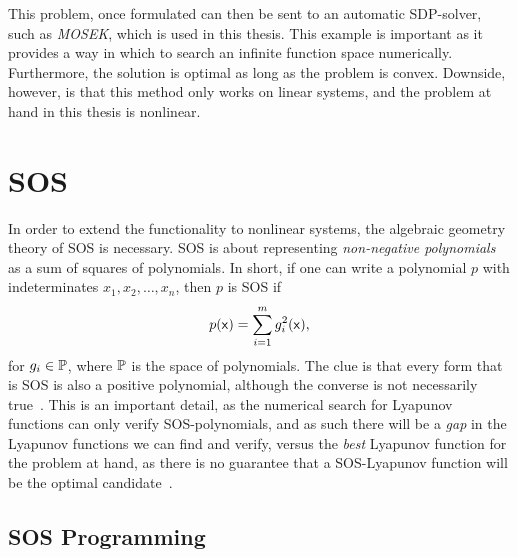 This problem, once formulated can then be sent to an automatic \ac{SDP}-solver,
such as \textit{MOSEK}\cite{mosek}, which is used in this thesis. This example
is important as it provides a way in which to search an infinite function space
numerically. Furthermore, the solution is optimal as long as the problem is
convex. Downside, however, is that this method only works on linear systems, and
the problem at hand in this thesis is nonlinear.

\section{SOS}

In order to extend the functionality to nonlinear systems, the algebraic
geometry theory of \ac{SOS} is necessary. \ac{SOS} is about representing
\textit{non-negative polynomials} as a sum of squares of polynomials. In short,
if one can write a polynomial \(p\) with indeterminates \(x_1,x_2,\ldots,x_n\),
then \(p\) is \ac{SOS} if
\[
  p(\vect{x}) = \sum_{i=1}^{m}g_i^2(\vect{x}),
\]
for \(g_i \in \P\), where \(\P\) is the space of polynomials. The clue is that
every form that is \ac{SOS} is also a positive polynomial, although the converse
is not necessarily true~\cite{majumdarFunnelLibrariesRealtime2017}. This is an
important detail, as the numerical search for Lyapunov functions can only verify
\ac{SOS}-polynomials, and as such there will be a \textit{gap} in the Lyapunov
functions we can find and verify, versus the \textit{best} Lyapunov function for
the problem at hand, as there is no guarantee that a \ac{SOS}-Lyapunov function
will be the optimal candidate~\cite{parilloStructuredSemidefinitePrograms}.

\subsection{SOS Programming}

